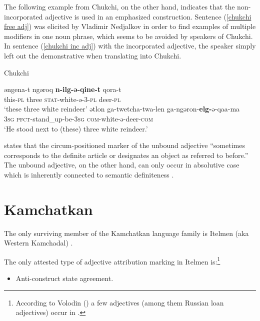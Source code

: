 The following example from Chukchi, on the other hand, indicates that the non-incorporated adjective is used in an emphasized construction. Sentence (\ref{chukchi free adj}) was elicited by Vladimir Nedjalkov \citep[cited as pc in][330]{rijkhoff2002} in order to find examples of multiple modifiers in one noun phrase, which seems to be avoided by speakers of Chukchi. In sentence (\ref{chukchi inc adj}) with the incorporated adjective, the speaker simply left out the demonstrative when translating into Chukchi.
\begin{exe}
\ex \rm{Chukchi \citep[Vladimir Nedjalkov, pc, cit.][330]{rijkhoff2002}}
\begin{xlist}
\ex \label{chukchi free adj}
\gll	əngena-t ngəroq \textbf{n-ilg-ə-qine-t} qora-t\\
	this-\textsc{pl} three \textsc{stat}-white-ə-3-\textsc{pl} deer-\textsc{pl}\\
\glt	‘these three white reindeer’
\ex \label{chukchi inc adj}
\gll	ətlon ga-twetcha-twa-len ga-ngəron-\textbf{elg-}ə-qaa-ma\\
	\textsc{3sg} \textsc{pfct}-stand\_up-be-\textsc{3sg} \textsc{com}-white-ə-deer-\textsc{com}\\
\glt	‘He stood next to (these) three white reindeer.’
\end{xlist}
\end{exe}
\citet[716]{bogoras1922} states that the circum-positioned marker of the unbound adjective “sometimes corresponds to the definite article or designates an object as referred to before.” The unbound adjective, on the other hand, can only occur in absolutive case which is inherently connected to semantic definiteness \citep[cf.][207, elsewhere]{dunn1999}.

\section{Kamchatkan}
The only surviving member of the Kamchatkan language family is Itelmen (aka Western Kamchadal) \citep[224]{salminen2007}.

The only attested type of adjective attribution marking in Itelmen is:\footnote{According to Volodin (\citeyear{volodin1997}) a few adjectives (among them Russian loan adjectives) occur in .}
\begin{itemize}
\item Anti\hyp{}construct state agreement.
\end{itemize}

